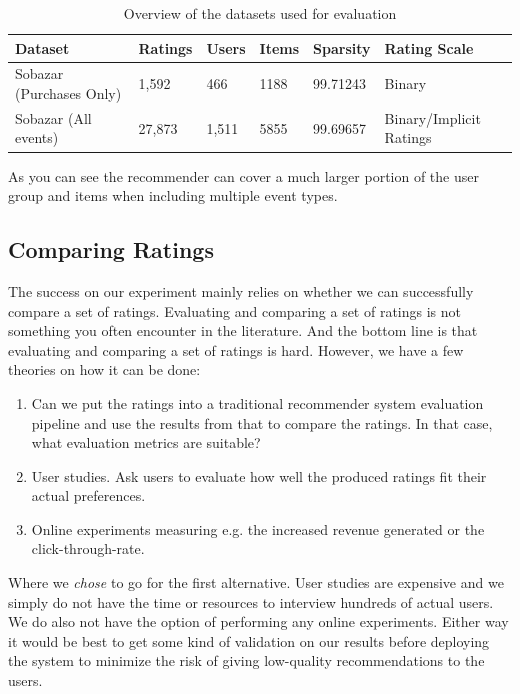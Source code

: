 \begin{table}[H]
    \centering
    \begin{tabular}{l l l l l l }
    \toprule
	Dataset						& 	Ratings		& 	Users		& 	Items 		& 	Sparsity			& Rating Scale 				    \\ \midrule
	Sobazar	(Purchases Only) 	&	1,592		&	466			&	1188		&	99.71243			& Binary						\\
	Sobazar (All events)		& 	27,873  	& 	1,511		&	5855		& 	99.69657			& Binary/Implicit Ratings		\\ 
	\bottomrule
    \end{tabular}
    \caption [Overview of the datasets used for evaluation]{Overview of the datasets used for evaluation}
    \label{table:datasets}
\end{table}

As you can see the recommender can cover a much larger portion of the user group and items when including multiple event types.

\subsection{Comparing Ratings}

The success on our experiment mainly relies on whether we can successfully compare a set of ratings.
Evaluating and comparing a set of ratings is not something you often encounter in the literature. And the
bottom line is that evaluating and comparing a set of ratings is hard. However, we have a few theories on
how it can be done:

\begin{enumerate}
\item Can we put the ratings into a traditional recommender system evaluation pipeline and use the
	  results from that to compare the ratings. In that case, what evaluation metrics are suitable?
\item User studies. Ask users to evaluate how well the produced ratings fit their actual preferences.
\item Online experiments measuring e.g. the increased revenue generated or the click-through-rate.
\end{enumerate}

Where we \emph{chose} to go for the first alternative. User studies are expensive and we simply do not
have the time or resources to interview hundreds of actual users. We do also not have the option of
performing any online experiments. Either way it would be best to get some kind of validation on
our results before deploying the system to minimize the risk of giving low-quality recommendations to
the users.

